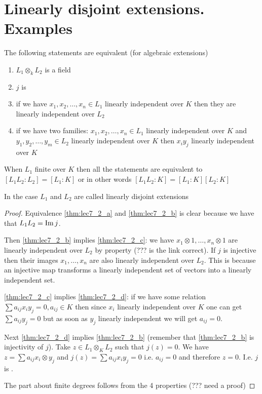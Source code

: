 \section{Linearly disjoint extensions. Examples}

\begin{theorem}
  The following statements are equivalent (for algebraic extensions)
  \begin{enumerate}
  \item $L_1 \otimes_k L_2$ is a field \label{thm:lec7_2_a}
  \item $j$ is  \label{thm:lec7_2_b}
  \item if we have $x_1, x_2, \dots, x_n \in L_1$ linearly independent
    over $K$ then they are linearly independent
    over $L_2$ \label{thm:lec7_2_c}
  \item if we have two families: $x_1, x_2, \dots, x_n \in L_1$ linearly independent
    over $K$ and  $y_1, y_2, \dots, y_m \in L_2$ linearly independent
    over $K$ then $x_i y_j$ linearly independent over $K$
    \label{thm:lec7_2_d}
  \end{enumerate}
  When $L_1$ finite over $K$ then all the statements are equivalent to
  $\left[L_1 L_2 : L_2\right] = \left[L_1 : K\right]$ or in other
  words
  $\left[L_1 L_2 : K\right] = \left[L_1 : K\right] \left[L_2 :
    K\right]$
  \begin{definition}
    In the case $L_1$ and $L_2$ are called linearly disjoint extensions
    \label{def:linearlydisjoint}
  \end{definition}
  \begin{proof}
    Equivalence \ref{thm:lec7_2_a} and \ref{thm:lec7_2_b} is clear
    because we have that $L_1 L_2 = \operatorname{Im} j$.

    Then \ref{thm:lec7_2_b} implies \ref{thm:lec7_2_c}: we have
    $x_1 \otimes 1, \dots, x_n \otimes 1$ are linearly independent
    over $L_2$ by  property (??? is the link
    correct). If $j$ is injective then their images $x_1, \dots, x_n$
    are also linearly independent over $L_2$. This is because an
    injective map transforms a linearly independent set of vectors
    into a linearly independent set.

    \ref{thm:lec7_2_c} implies \ref{thm:lec7_2_d}: if we have some
    relation $\sum a_{ij} x_i y_j = 0, a_{ij} \in K$ then since $x_i$
    linearly independent over $K$ one can get $\sum a_{ij} y_j = 0$
    but as soon as $y_j$ linearly independent we will get $a_{ij} =
    0$.

    Next \ref{thm:lec7_2_d} implies \ref{thm:lec7_2_b} (remember that
    \ref{thm:lec7_2_b} is injectivity of $j$). Take
    $z \in L_1 \otimes_K L_2$ such that $j\left(z\right) = 0$. We have
    $z = \sum a_{ij} x_i \otimes y_j$ and
    $j\left(z\right) = \sum a_{ij} x_i y_j = 0$ i.e. $a_{ij} = 0$ and
    therefore $z = 0$. I.e. $j$ is .

    The part about finite degrees follows from the 4 properties (???
    need a proof)
  \end{proof}
  \label{thm:lec7_2}
\end{theorem}

